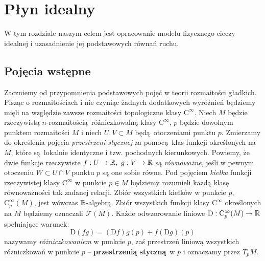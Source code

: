 \chapter{Płyn idealny} W tym rozdziale naszym celem jest opracowanie modelu fizycznego cieczy idealnej i uzasadnienie jej podstawowych równań ruchu.

\section{Pojęcia wstępne}
Zaczniemy od przypomnienia podstawowych pojęć w teorii rozmaitości gładkich. Pisząc o rozmaitościach i nie czyniąc żadnych dodatkowych wyróżnień będziemy mięli na względzie zawsze rozmaitości topologiczne klasy \(\mathrm{C}^{\infty}\). Niech \(M\) będzie rzeczywistą \(n\)-rozmaitością różniczkowalną klasy \(\mathrm{C}^\infty\), \(p\) będzie dowolnym punktem rozmaitości \(M\) i niech \(U, V\subset M\) będą otoczeniami punktu \(p\). Zmierzamy do określenia pojęcia \emph{przestrzeni stycznej} za pomocą klas funkcji określonych na \(M\), które są lokalnie identyczne i tzw. pochodnych kierunkowych. Powiemy, że dwie funkcje rzeczywiste \(f:U\to\R,\ g:V\to\R\) są \emph{równoważne}, jeśli w pewnym otoczeniu \(W\subset U\cap V\) punktu \(p\) są one sobie równe. Pod pojęciem \emph{kiełka} funkcji rzeczywistej klasy \(\mathrm{C}^\infty\) w punkcie \(p\in M\) będziemy rozumieli każdą klasę równoważności tak zadanej relacji. Zbiór wszystkich kiełków w punkcie \(p\), \(\mathrm{C}_p^\infty(M)\), jest wówczas \(\mathbb{R}\)-algebrą. Zbiór wszystkich funkcji klasy \(\mathrm{C}^\infty\) określonych na \(M\) będziemy oznaczali \(\mathcal{F}(M)\).
Każde odwzorowanie liniowe \(\mathrm{D}:\mathrm{C}_p^\infty(M)\to\mathbb{R}\) spełniające warunek:
\begin{equation}\label{eq:differentiation}
    \mathrm{D}(fg) = (\mathrm{D}f)g(p) + f(\mathrm{D}g)(p)
\end{equation}
nazywamy \emph{różniczkowaniem} w punkcie \(p\), zaś przestrzeń liniową wszystkich różniczkowań w punkcie \(p\) -- \textbf{przestrzenią styczną} w \(p\) i oznaczamy przez \(T_pM\).

